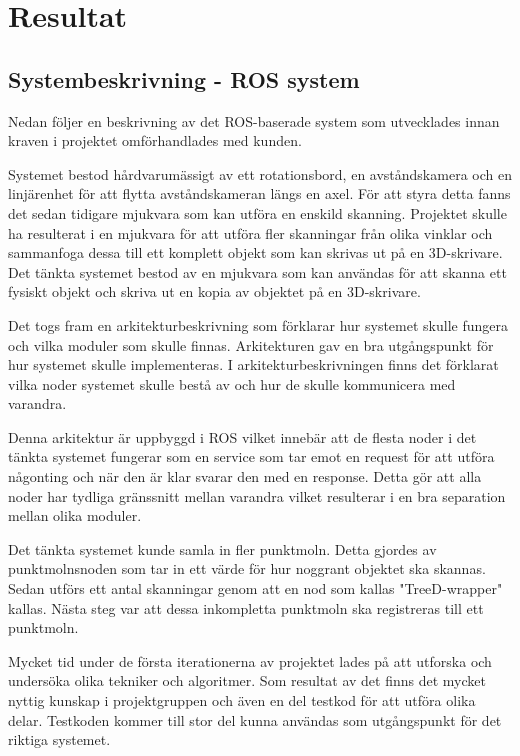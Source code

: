 \chapter{Resultat}
\label{cha:results}

\section{Systembeskrivning - ROS system}

Nedan följer en beskrivning av det ROS-baserade system som utvecklades innan kraven i projektet omförhandlades med kunden.
  
Systemet bestod hårdvarumässigt av ett rotationsbord, en avståndskamera och en linjärenhet för att flytta avståndskameran längs en axel. För att styra detta fanns det sedan tidigare mjukvara som kan utföra en enskild skanning. Projektet skulle ha resulterat i en mjukvara för att utföra fler skanningar från olika vinklar och sammanfoga dessa till ett komplett objekt som kan skrivas ut på en 3D-skrivare. Det tänkta systemet bestod av en mjukvara som kan användas för att skanna ett fysiskt objekt och skriva ut en kopia av objektet på en 3D-skrivare.


Det togs fram en arkitekturbeskrivning som förklarar hur systemet skulle fungera och vilka moduler som skulle finnas. Arkitekturen gav en bra utgångspunkt för hur systemet skulle implementeras. I arkitekturbeskrivningen finns det förklarat vilka noder systemet skulle bestå av och hur de skulle kommunicera med varandra.

Denna arkitektur är uppbyggd i ROS vilket innebär att de flesta noder i det tänkta systemet fungerar som en service som tar emot en request för att utföra någonting och när den är klar svarar den med en response. Detta gör att alla noder har tydliga gränssnitt mellan varandra vilket resulterar i en bra separation mellan olika moduler.

Det tänkta systemet kunde samla in fler punktmoln. Detta gjordes av punktmolnsnoden som tar in ett värde för hur noggrant objektet ska skannas. Sedan utförs ett antal skanningar genom att en nod som kallas "TreeD-wrapper" kallas. Nästa steg var att dessa inkompletta punktmoln ska registreras till ett punktmoln.

Mycket tid under de första iterationerna av projektet  lades på att utforska och undersöka olika tekniker och algoritmer. Som resultat av det finns det mycket nyttig kunskap i projektgruppen och även en del testkod för att utföra olika delar. Testkoden kommer till stor del kunna användas som utgångspunkt för det riktiga systemet.

